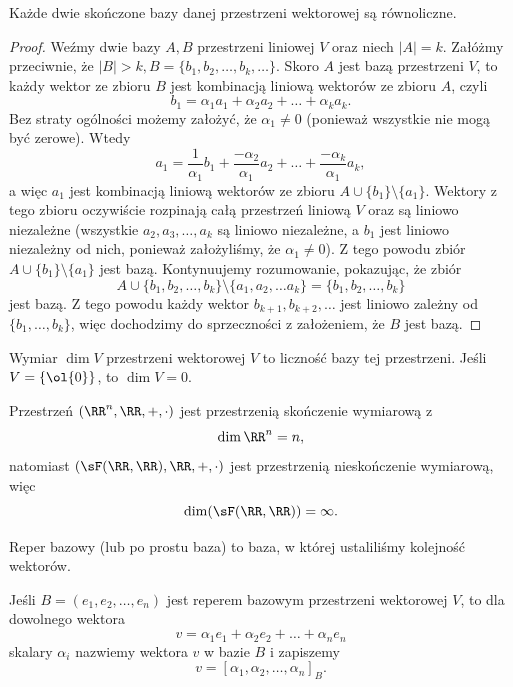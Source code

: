 \begin{theorem}
    Każde dwie skończone bazy danej przestrzeni wektorowej są równoliczne.
\end{theorem}
\begin{proof}
    Weźmy dwie bazy $A, B$ przestrzeni liniowej $V$ oraz niech $|A| = k$. Załóżmy przeciwnie, że $|B| > k, B = \{b_1, b_2, \ldots, b_k, \ldots\}$. Skoro $A$ jest bazą przestrzeni $V$, to każdy wektor ze zbioru $B$ jest kombinacją liniową wektorów ze zbioru $A$, czyli
    \[ b_1 = \alpha_1a_1 + \alpha_2a_2 + \ldots + \alpha_ka_k. \]
    Bez straty ogólności możemy założyć, że $\alpha_1 \neq 0$ (ponieważ wszystkie nie mogą być zerowe). Wtedy
    \[ a_1 = \frac{1}{\alpha_1}b_1 + \frac{-\alpha_2}{\alpha_1}a_2 + \ldots + \frac{-\alpha_k}{\alpha_1}a_k, \]
    a więc $a_1$ jest kombinacją liniową wektorów ze zbioru $A \cup \{b_1\} \setminus \{a_1\}$. Wektory z tego zbioru oczywiście rozpinają całą przestrzeń liniową $V$ oraz są liniowo niezależne (wszystkie $a_2, a_3, \ldots, a_k$ są liniowo niezależne, a $b_1$ jest liniowo niezależny od nich, ponieważ założyliśmy, że $\alpha_1 \neq 0$). Z tego powodu zbiór $A \cup \{b_1\} \setminus \{a_1\}$ jest bazą. Kontynuujemy rozumowanie, pokazując, że zbiór
    \[ A \cup \{b_1, b_2, \ldots, b_k\} \setminus \{a_1, a_2, \ldots a_k\} = \{b_1, b_2, \ldots, b_k\} \]
    jest bazą. Z tego powodu każdy wektor $b_{k+1}, b_{k+2}, \ldots$ jest liniowo zależny od $\{b_1, \ldots, b_k\}$, więc dochodzimy do sprzeczności z założeniem, że $B$ jest bazą.
\end{proof}

\begin{definition}
    Wymiar $\dim V$ przestrzeni wektorowej $V$ to liczność bazy tej przestrzeni. Jeśli $V = \{\ol{0}\}$, to $\dim V = 0$.
\end{definition}

\begin{example}
    Przestrzeń $(\RR^n, \RR, +, \cdot)$ jest przestrzenią skończenie wymiarową z
    \[ \dim\RR^n = n, \]
    natomiast $(\sF(\RR,\RR), \RR, +, \cdot)$ jest przestrzenią nieskończenie wymiarową, więc
    \[ \dim (\sF(\RR,\RR)) = \infty. \]
\end{example}

\begin{definition}
    Reper bazowy (lub po prostu baza) to baza, w której ustaliliśmy kolejność wektorów.
\end{definition}

Jeśli $B = (e_1, e_2, \ldots, e_n)$ jest reperem bazowym przestrzeni wektorowej $V$, to dla dowolnego wektora
\[ v = \alpha_1e_1 + \alpha_2e_2 + \ldots + \alpha_ne_n \]
skalary $\alpha_i$ nazwiemy  wektora $v$ w bazie $B$ i zapiszemy
\[ v = [\alpha_1, \alpha_2, \ldots, \alpha_n]_B. \]

